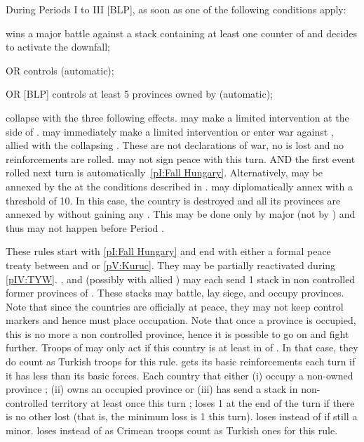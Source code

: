  \hfill {}\label{chSpecific:Hungary}
\bparag During Periods I to III [BLP], as soon as one of the
following conditions apply:
\begin{modlist}
\item \TUR wins a major battle against a stack containing at least one
  \ARMY counter of \paysHongrie and decides to activate the downfall;
\item[OR] \TUR controls \villeBuda (automatic);
\item[OR] [BLP] \TUR controls at least 5 provinces owned by
  \paysHongrie (automatic);
\end{modlist}
\paysHongrie collapse with the three following effects.
\bparag \POL may make a limited intervention at the side of
\paysHongrie. \HAB may immediately make a limited intervention or
enter war against \TUR, allied with the collapsing \paysHongrie. These
are not declarations of war, no \STAB is lost and no reinforcements are
rolled.
\bparag \TUR may not sign peace with \paysHongrie this turn.
\bparag AND the first event rolled next turn is
automatically~\ref{pI:Fall Hungary}.
\bparag Alternatively,  may be annexed by the \hab at the
conditions described in .
\bparag[] [BLP] \AUS may diplomatically annex \paysHongrie with a
threshold of 10. In this case, the country is destroyed and all its
provinces are annexed by \AUS without gaining any \VPs. This may be
done only by major \AUS (not by \HAB) and thus may not happen before
Period .

 \hfill
{}\label{chSpecific:Little war}
\bparag These rules start with \ref{pI:Fall Hungary} and end with
either a formal peace treaty between \TUR and \HAB or
\ref{pV:Kuruc}. They may be partially reactivated during \ref{pIV:TYW}.
\bparag \HAB, \POL and \TUR (possibly with allied \paysCrimee) may
each send 1 stack in non controlled former provinces of \paysHongrie.
\bparag These stacks may battle, lay siege, and occupy provinces. Note
that since the countries are officially at peace, they may not keep
control markers and hence must place occupation. Note that once a
province is occupied, this is no more a non controlled province, hence
it is possible to go on and fight further.
\bparag Troops of \paysCrimee may only act if this country is at least
in \EW of \TUR. In that case, they do count as Turkish troops for this
rule. \paysCrimee gets its basic reinforcements each turn if it has
less than its basic forces.
\bparag Each country that either (i) occupy a non-owned province ;
(ii) owns an occupied province or (iii) has send a stack in
non-controlled territory at least once this turn ; loses 1 \STAB at
the end of the turn if there is no other \STAB lost (that is, the
minimum loss is 1 \STAB this turn). \HIS loses \STAB instead of \HAB
if still a minor. \TUR loses \STAB instead of \paysCrimee as Crimean
troops count as Turkish ones for this rule.



